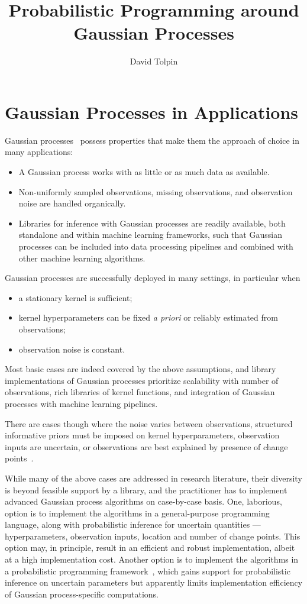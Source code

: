 \documentclass[sigplan,review]{acmart}\settopmatter{printfolios=true,printccs=false,printacmref=false}
\title{Probabilistic Programming around Gaussian Processes}
\author{David Tolpin}
\affiliation{
    \institution{PUB+}
    \country{Israel}
}
\begin{document}
\maketitle

\section{Gaussian Processes in Applications}

Gaussian processes~\cite{} possess properties that make
them the approach of choice in many applications:
\begin{itemize}
    \item A Gaussian process works with as little or as much
    	data as available.
    \item Non-uniformly sampled observations, missing
    	observations, and observation noise are handled
    	organically.
    \item Libraries for inference with Gaussian processes
    	are readily available, both standalone and within
    	machine learning frameworks, such that Gaussian
    	processes can be included into data processing
    	pipelines and combined with other machine learning
    	algorithms.
\end{itemize}

Gaussian processes are successfully deployed in many settings,
in particular when 
\begin{itemize}
    \item a stationary kernel is sufficient;
    \item kernel hyperparameters can be fixed \textit{a priori} or
    	reliably estimated from observations;
    \item observation noise is constant.
\end{itemize}
Most basic cases are indeed covered by the above assumptions,
and library implementations of Gaussian processes prioritize
scalability with number of observations, rich libraries
of kernel functions, and integration of Gaussian processes with
machine learning pipelines.

There are cases though where the noise varies between
observations, structured informative priors must be imposed on
kernel hyperparameters, observation inputs are uncertain, or
observations are best explained by presence of change
points~\cite{}.

While many of the above cases are addressed in research
literature, their diversity is beyond feasible support by a
library, and the practitioner has to implement advanced Gaussian
process algorithms on case-by-case basis. One, laborious, option
is to implement the algorithms in a general-purpose programming
language, along with probabilistic inference for uncertain
quantities --- hyperparameters, observation inputs, location and
number of change points.  This option may, in principle, result
in an efficient and robust implementation, albeit at a high
implementation cost. Another option is to implement the
algorithms in a probabilistic programming framework~\cite{},
which gains support for probabilistic inference on uncertain
parameters but apparently limits implementation efficiency of
Gaussian process-specific computations.
\end{document}
